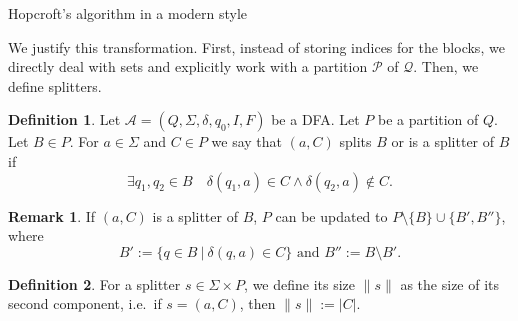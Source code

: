 \documentclass[12pt, a4 paper]{article}
\theoremstyle{definition}
\newtheorem{remark}{Remark}
\newtheorem{definition}{Definition}
\begin{document}
\begin{algorithm}[H]
    \SetAlgoLined
    \caption{Hopcroft's algorithm in a modern style}
    \label{alg:modern}
\end{algorithm}

\bigskip

We justify this transformation.
First, instead of storing indices for the blocks, we directly deal with sets and explicitly work with a partition $\mathcal{P}$ of $\mathcal{Q}$.
Then, we define splitters.

\begin{definition}
    Let $\mathcal{A} = (Q, \Sigma, \delta, q_0, I, F)$ be a DFA. Let $P$ be a partition of $Q$. Let $B \in P$. For $a \in \Sigma$ and $C \in P$ we say that
    $(a, C)$ splits $B$ or is a splitter of $B$ if $$\exists q_1, q_2 \in B \quad \delta(q_1, a) \in C \land \delta(q_2, a) \notin C.$$
\end{definition}
\begin{remark}
    If $(a, C)$ is a splitter of $B$, $P$ can be updated to $P \setminus \{B\} \cup \{B', B''\}$, where $$B' := \{q \in B \ | \ \delta(q, a) \in C\} \text{ and } B'' := B \setminus B'.$$
\end{remark}

\begin{definition}
    For a splitter $s \in \Sigma \times P$, we define its size $\| s \|$ as the size of its second component, i.e.\ if $s = (a, C)$, then $\| s \| := |C|$.
\end{definition}
\end{document}
